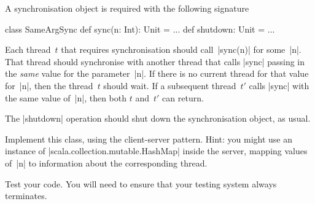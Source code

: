 \begin{question}
A synchronisation object is required with the following signature
%
\begin{scala}
class SameArgSync{
  def sync(n: Int): Unit = ...
  def shutdown: Unit = ...
}
\end{scala}
%
Each thread~$t$ that requires synchronisation should call~|sync(n)| for
some~|n|.  That thread should synchronise with another thread that calls
|sync| passing in the \emph{same} value for the parameter~|n|.  If there is no
current thread for that value for~|n|, then the thread~$t$ should wait.  If a
subsequent thread~$t'$ calls |sync| with the same value of~|n|, then both $t$
and~$t'$ can return.  

The |shutdown| operation should shut down the synchronisation object, as
usual. 

Implement this class, using the client-server pattern.  Hint: you might use an
instance of |scala.collection.mutable.HashMap| inside the server, mapping
values of~|n| to information about the corresponding thread.

Test your code.  You will need to ensure that your testing system always
terminates. 
\end{question}


